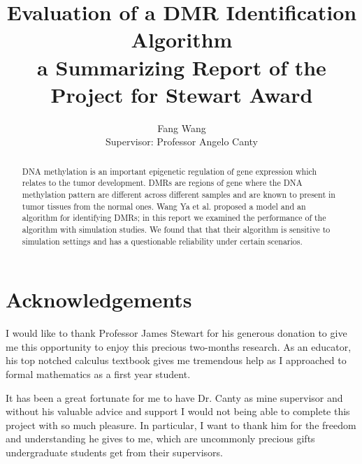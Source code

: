 \documentclass{report}
\author{Fang Wang \\
Supervisor: Professor Angelo Canty
}
\title{ \textbf{\huge{Evaluation of a DMR Identification Algorithm}} \\
a Summarizing Report of the Project for Stewart Award
}
\begin{document}
\newcommand{\RR}{\mathbb{R}}
\newcommand{\ZZ}{\mathbb{Z}}
\newcommand{\NN}{\mathbb{N}}
\newcommand{\QQ}{\mathbb{Q}}
\newcommand{\CC}{\mathbb{C}}
\newcommand{\sumi}[2][1]{\sum\limits_{i=#1}^{#2}}
\newcommand{\sumk}[2][1]{\sum\limits_{k=#1}^{#2}}
\newcommand{\sumj}[2][1]{\sum\limits_{j=#1}^{#2}}
\newcommand{\sumx}[2][1]{\sum\limits_{x=#1}^{#2}}
\newcommand{\sumn}[2][1]{\sum\limits_{n=#1}^{#2}}
\newcommand{\prodi}[2][1]{\prod\limits_{i=#1}^{#2}}
\newcommand{\prodk}[2][1]{\prod\limits_{k=#1}^{#2}}
\newcommand{\E}[2][]{ \mathrm{E}_{#1} \left[ #2 \right]}
\newcommand{\Var}[1]{ \mathrm{Var} \left[ #1 \right]}
\newcommand{\Cov}[1]{ \mathrm{Cov} \left[ #1 \right]}
\renewcommand{\P}[2][]{ \mathrm{P}_{#1} \left( #2 \right)}
\newcommand{\iidis}{\stackrel{iid}{\sim}}
\maketitle
\begin{abstract}
 DNA methylation is an important epigenetic regulation of gene expression which relates to the tumor development. DMRs are regions of gene where the DNA methylation pattern are different across different samples and are known to present in
 tumor tissues from the normal ones. Wang Ya et al. proposed a model and an algorithm for identifying DMRs; in this report we examined
 the performance of the algorithm with simulation studies. We found that that their algorithm is sensitive to simulation settings and has a questionable reliability under certain scenarios.
 
\end{abstract}

\section*{Acknowledgements}
\par I would like to thank Professor James Stewart for his generous donation to give me this opportunity to enjoy this precious two-months research. As an educator, his top notched calculus textbook gives me tremendous help as I approached to formal mathematics as a first year student.
\par
    It has been a great fortunate for me to have Dr. Canty as mine supervisor and without his valuable advice and support I would not being able to complete this project with so much pleasure. In particular, I want to thank him for the
    freedom and understanding he gives to me, which are uncommonly precious gifts undergraduate students  get from their supervisors.
    
\end{document}
